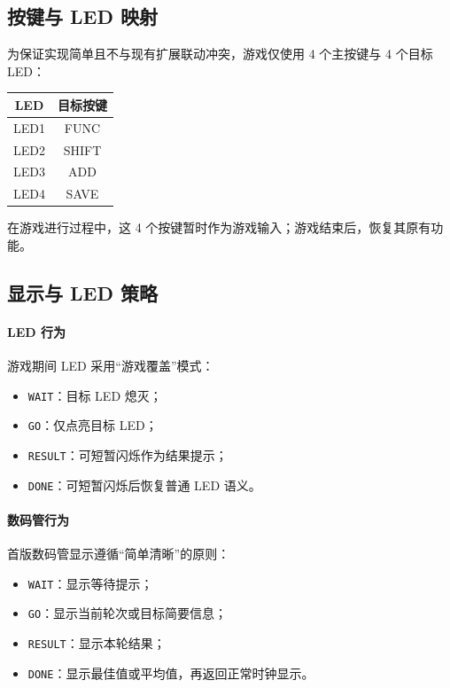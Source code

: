 \documentclass[main.tex]{subfiles}
\begin{document}
\subsection{按键与 LED 映射}

为保证实现简单且不与现有扩展联动冲突，游戏仅使用 4 个主按键与 4 个目标 LED：

\begin{center}
\begin{tabular}{cc}
\toprule
LED & 目标按键 \\
\midrule
LED1 & FUNC \\
LED2 & SHIFT \\
LED3 & ADD \\
LED4 & SAVE \\
\bottomrule
\end{tabular}
\end{center}

在游戏进行过程中，这 4 个按键暂时作为游戏输入；游戏结束后，恢复其原有功能。

\subsection{显示与 LED 策略}

\paragraph{LED 行为}
游戏期间 LED 采用“游戏覆盖”模式：

\begin{itemize}[leftmargin=2em]
  \item \texttt{WAIT}：目标 LED 熄灭；
  \item \texttt{GO}：仅点亮目标 LED；
  \item \texttt{RESULT}：可短暂闪烁作为结果提示；
  \item \texttt{DONE}：可短暂闪烁后恢复普通 LED 语义。
\end{itemize}

\paragraph{数码管行为}
首版数码管显示遵循“简单清晰”的原则：

\begin{itemize}[leftmargin=2em]
  \item \texttt{WAIT}：显示等待提示；
  \item \texttt{GO}：显示当前轮次或目标简要信息；
  \item \texttt{RESULT}：显示本轮结果；
  \item \texttt{DONE}：显示最佳值或平均值，再返回正常时钟显示。
\end{itemize}
\end{document}
